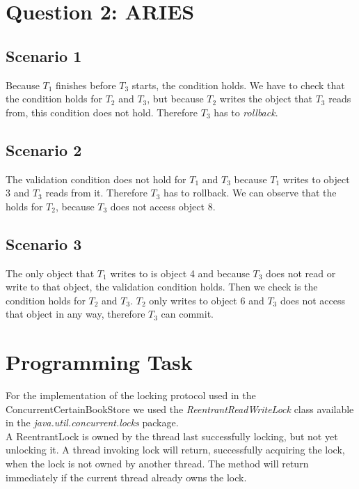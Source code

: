 \documentclass{article}      %
\begin{document}
\section*{Question 2: ARIES}

\subsection*{Scenario 1}

Because $T_1$ finishes before $T_3$ starts, the  condition holds. We have to check that the  condition holds for $T_2$ and $T_3$, but because $T_2$ writes the object that $T_3$ reads from, this condition does not hold. Therefore $T_3$ has to \emph{rollback}.\\

\subsection*{Scenario 2}

The  validation condition does not hold for $T_1$ and $T_3$ because $T_1$ writes to object 3 and $T_3$ reads from it. Therefore $T_3$ has to rollback. We can observe that the  holds for $T_2$, because $T_3$ does not access object 8.\\

\subsection*{Scenario 3}

The only object that $T_1$ writes to is object 4 and because $T_3$ does not read or write to that object, the  validation condition holds. Then we check is the  condition holds for $T_2$ and $T_3$. $T_2$ only writes to object 6 and $T_3$ does not access that object in any way, therefore $T_3$ can commit.\\

\section*{Programming Task}

For the implementation of the locking protocol used in the ConcurrentCertainBookStore we used the \emph{ReentrantReadWriteLock} class available in the \emph{java.util.concurrent.locks} package. \\

A ReentrantLock is owned by the thread last successfully locking, but not yet unlocking it. A thread invoking lock will return, successfully acquiring the lock, when the lock is not owned by another thread. The method will return immediately if the current thread already owns the lock.\\
\end{document}
